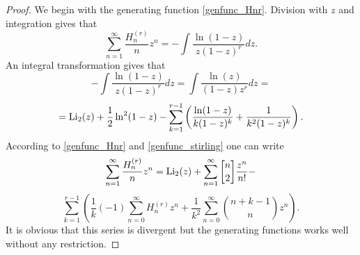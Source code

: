 \documentclass[a4paper,12pt]{amsart}
\begin{document}
\begin{proof}We begin with the generating function \eqref{genfunc_Hnr}. Division with $z$ and integration gives that
\[\sum_{n=1}^\infty \frac{H_n^{(r)}}{n}z^n=-\int\frac{\ln(1-z)}{z(1-z)^r}dz.\]
An integral transformation gives that
\[-\int\frac{\ln(1-z)}{z(1-z)^r}dz=\int\frac{\ln(z)}{(1-z)z^r}dz=\]
\[={\mathop{\textup{Li}}\nolimits}_2(z)+\frac{1}{2}\ln^2(1-z)-\sum_{k=1}^{r-1}\left(\frac{\ln(1-z)}{k(1-z)^k}+\frac{1}{k^2(1-z)^k}\right).\]
According to \eqref{genfunc_Hnr} and \eqref{genfunc_stirling} one can write
\[\sum_{n=1}^\infty \frac{H_n^{(r)}}{n}z^n={\mathop{\textup{Li}}\nolimits}_2(z)+\sum_{n=1}^\infty{\genfrac[]{0pt}{}{{n}}{{2}}}\frac{z^n}{n!}-\]
\[\sum_{k=1}^{r-1}\left(\frac{1}{k}(-1)\sum_{n=0}^\infty H_n^{(r)}z^n+\frac{1}{k^2}\sum_{n=0}^\infty\binom{n+k-1}{n}z^n\right).\]
It is obvious that this series is divergent but the generating functions works well without any restriction.


\end{proof}
\end{document}
